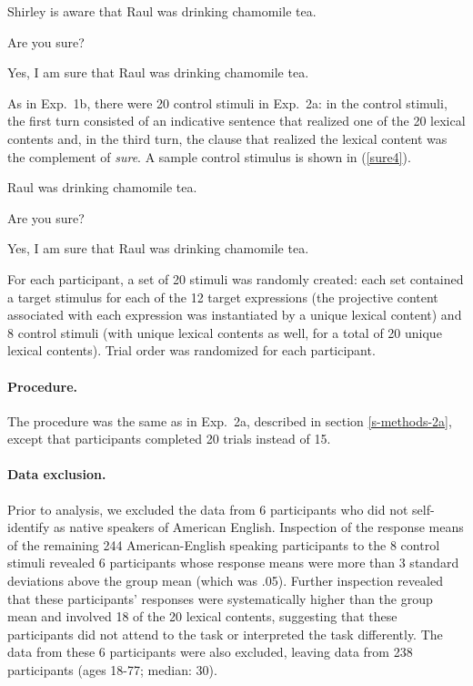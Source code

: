 \documentclass[11pt,fleqn]{article}
\newcommand{\6}{\mbox{$[\hspace*{-.6mm}[$}}
\newcommand{\9}{\mbox{$]\hspace*{-.6mm}]$}}
\begin{document}
\begin{exe}
\ex\label{sure3}
\begin{xlist}
 Shirley is aware that Raul was drinking chamomile tea.

 Are you sure?

 Yes, I am sure that Raul was drinking chamomile tea.
\end{xlist}
\end{exe}

As in Exp.~1b, there were 20 control stimuli in Exp.~2a: in the control stimuli, the first turn consisted of an indicative sentence that realized one of the 20 lexical contents and, in the third turn, the clause that realized the lexical content was the complement of {\em sure}. A sample control stimulus is shown in (\ref{sure4}).

\begin{exe}
\ex\label{sure4}
\begin{xlist}
 Raul was drinking chamomile tea.

 Are you sure?

 Yes, I am sure that Raul was drinking chamomile tea.
\end{xlist}
\end{exe}

For each participant, a set of 20 stimuli was randomly created: each set contained a target stimulus for each of the 12 target expressions (the projective content associated with each expression was instantiated by a unique lexical content) and 8 control stimuli (with unique lexical contents as well, for a total of 20 unique lexical contents). Trial order was randomized for each participant.

\paragraph{Procedure.} The procedure was the same as in Exp.~2a, described in section \ref{s-methods-2a}, except that participants completed 20 trials instead of 15.

\paragraph{Data exclusion.} Prior to analysis, we excluded the data from 6 participants who did not self-identify as native speakers of American English. Inspection of the response means of the remaining 244 American-English speaking participants to the 8 control stimuli revealed 6 participants whose response means were more than 3 standard deviations above the group mean (which was .05). Further inspection revealed that these participants' responses were systematically higher than the group mean and involved 18 of the 20 lexical contents, suggesting that these participants did not attend to the task or interpreted the task differently. The data from these 6 participants were also excluded, leaving data from 238 participants (ages 18-77; median: 30).
\end{document}
